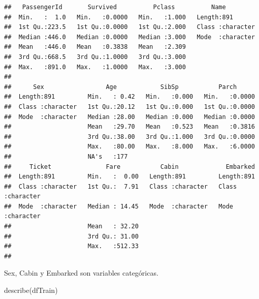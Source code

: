 \documentclass[
]{article}
\newenvironment{Shaded}{\begin{snugshade}}{\end{snugshade}}
\newcommand{\KeywordTok}[1]{\textcolor[rgb]{0.94,0.87,0.69}{#1}}
\newcommand{\NormalTok}[1]{\textcolor[rgb]{0.80,0.80,0.80}{#1}}
\begin{document}
\begin{verbatim}
##   PassengerId       Survived          Pclass          Name          
##  Min.   :  1.0   Min.   :0.0000   Min.   :1.000   Length:891        
##  1st Qu.:223.5   1st Qu.:0.0000   1st Qu.:2.000   Class :character  
##  Median :446.0   Median :0.0000   Median :3.000   Mode  :character  
##  Mean   :446.0   Mean   :0.3838   Mean   :2.309                     
##  3rd Qu.:668.5   3rd Qu.:1.0000   3rd Qu.:3.000                     
##  Max.   :891.0   Max.   :1.0000   Max.   :3.000                     
##                                                                     
##      Sex                 Age            SibSp           Parch       
##  Length:891         Min.   : 0.42   Min.   :0.000   Min.   :0.0000  
##  Class :character   1st Qu.:20.12   1st Qu.:0.000   1st Qu.:0.0000  
##  Mode  :character   Median :28.00   Median :0.000   Median :0.0000  
##                     Mean   :29.70   Mean   :0.523   Mean   :0.3816  
##                     3rd Qu.:38.00   3rd Qu.:1.000   3rd Qu.:0.0000  
##                     Max.   :80.00   Max.   :8.000   Max.   :6.0000  
##                     NA's   :177                                     
##     Ticket               Fare           Cabin             Embarked        
##  Length:891         Min.   :  0.00   Length:891         Length:891        
##  Class :character   1st Qu.:  7.91   Class :character   Class :character  
##  Mode  :character   Median : 14.45   Mode  :character   Mode  :character  
##                     Mean   : 32.20                                        
##                     3rd Qu.: 31.00                                        
##                     Max.   :512.33                                        
## 
\end{verbatim}

Sex, Cabin y Embarked son variables categóricas.

\begin{Shaded}
\begin{Highlighting}[]
\KeywordTok{describe}\NormalTok{(dfTrain)}
\end{Highlighting}
\end{Shaded}
\end{document}
